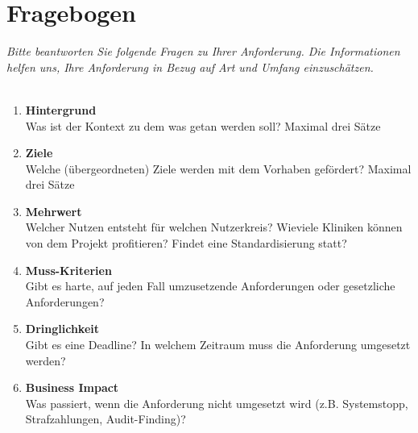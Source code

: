 \section{Fragebogen}
\textit{Bitte beantworten Sie folgende Fragen zu Ihrer Anforderung. Die Informationen helfen uns, Ihre Anforderung in Bezug auf Art und Umfang einzuschätzen. \\ \\
}

\begin{Form}
  \begin{enumerate}
  	\item \textbf{Hintergrund} \\
  	Was ist der Kontext zu dem was getan werden soll? Maximal drei Sätze \\
  	\TextField[multiline, name=background,width=0.9\textwidth,  height=2cm, value={} ]{}
  	
  	\item \textbf{Ziele} \\
  	Welche (übergeordneten) Ziele werden mit dem Vorhaben gefördert? Maximal drei Sätze  \\
  	\TextField[multiline, name=goal,width=0.9\textwidth,  height=2cm, value={} ]{}
  	
  	\item \textbf{Mehrwert} \\
  	Welcher Nutzen entsteht für welchen Nutzerkreis? Wieviele Kliniken können von dem Projekt profitieren? Findet eine Standardisierung statt?  \\
  	\TextField[multiline, name=value,width=0.9\textwidth,  height=2cm, value={} ]{}
  	
  	\item \textbf{Muss-Kriterien} \\
  	Gibt es harte, auf jeden Fall umzusetzende Anforderungen oder gesetzliche Anforderungen?   \\
  	\TextField[multiline, name=must,width=0.9\textwidth,  height=2cm, value={} ]{}
  	
  	\item \textbf{Dringlichkeit } \\
  Gibt es eine Deadline? In welchem Zeitraum muss die Anforderung umgesetzt werden? \\
  	\TextField[multiline, name=priority,width=0.9\textwidth,  height=2cm, value={} ]{}
  	\newpage
  	\item \textbf{Business Impact} \\
  	Was passiert, wenn die Anforderung nicht umgesetzt wird (z.B. Systemstopp, Strafzahlungen, Audit-Finding)?   \\
  	\TextField[multiline, name=business,width=0.9\textwidth,  height=2cm, value={} ]{}
  	

\end{enumerate}
\end{Form}
